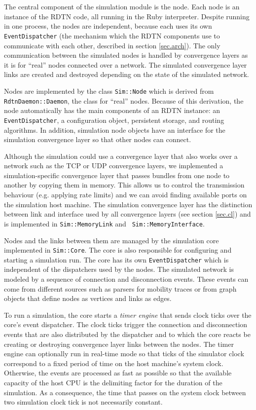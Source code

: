 \documentclass{article}
\begin{document}
The central component of the simulation module is the node. Each node is an
instance of the RDTN code, all running in the Ruby interpreter. Despite running
in one process, the nodes are independent, because each uses its own {\tt
EventDispatcher} (the mechanism which the RDTN components use to communicate
with each other, described in section \ref{sec.arch}). The only communication
between the simulated nodes is handled by convergence layers as it is for
``real'' nodes connected over a network. The simulated convergence layer links
are created and destroyed depending on the state of the simulated network.

Nodes are implemented by the class {\tt Sim::Node} which is derived from {\tt
RdtnDaemon::Daemon}, the class for ``real'' nodes. Because of this derivation,
the node automatically has the main components of an RDTN instance: an {\tt
EventDispatcher}, a configuration object, persistent storage, and routing
algorithms. In addition, simulation node objects have an interface for the
simulation convergence layer so that other nodes can connect.

Although the simulation could use a convergence layer that also works over a
network such as the TCP or UDP convergence layers, we implemented a
simulation-specific convergence layer that passes bundles from one node to
another by copying them in memory. This allows us to control the transmission
behaviour (e.g. applying rate limits) and we can avoid finding available ports
on the simulation host machine. The simulation convergence layer has
the distinction between link and interface used by all convergence layers (see
section \ref{sec.cl}) and is implemented in {\tt Sim::MemoryLink} and {\tt
Sim::MemoryInterface}.

Nodes and the links between them are managed by the simulation core implemented
in {\tt Sim::Core}. The core is also responsible for configuring and starting a
simulation run. The core has its own {\tt EventDispatcher} which is independent
of the dispatchers used by the nodes. The simulated network is modeled by a
sequence of connection and disconnection events. These events can come from
different sources such as parsers for mobility traces or from graph objects that
define nodes as vertices and links as edges.

To run a simulation, the core starts a {\em timer engine} that sends clock ticks
over the core's event dispatcher. The clock ticks trigger the connection and
disconnection events that are also distributed by the dispatcher and to which
the core reacts be creating or destroying convergence layer links between the
nodes. The timer engine can optionally run in real-time mode so that ticks of
the simulator clock correspond to a fixed period of time on the host machine's
system clock. Otherwise, the events are processed as fast as possible so that
the available capacity of the host CPU is the delimiting factor for the duration
of the simulation. As a consequence, the time that passes on the system clock
between two simulation clock tick is not necessarily constant.
\end{document}
